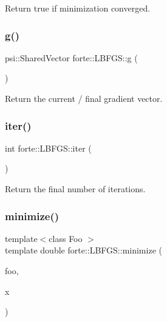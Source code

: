 Return true if minimization converged. 

\mbox{\label{classforte_1_1_l_b_f_g_s_ac92f946ad0a620b0fef33b96619b0b75}} 
\subsubsection{\texorpdfstring{g()}{g()}}
{\footnotesize\ttfamily psi\+::\+Shared\+Vector forte\+::\+L\+B\+F\+G\+S\+::g (\begin{DoxyParamCaption}{ }\end{DoxyParamCaption})\hspace{0.3cm}{\ttfamily [inline]}}



Return the current / final gradient vector. 

\mbox{\label{classforte_1_1_l_b_f_g_s_a90ca8b4968b604d3215c0ea4ce6275d4}} 
\subsubsection{\texorpdfstring{iter()}{iter()}}
{\footnotesize\ttfamily int forte\+::\+L\+B\+F\+G\+S\+::iter (\begin{DoxyParamCaption}{ }\end{DoxyParamCaption})\hspace{0.3cm}{\ttfamily [inline]}}



Return the final number of iterations. 

\mbox{\label{classforte_1_1_l_b_f_g_s_a2e1e9e0d39664cb70a631317d3eeea09}} 
\subsubsection{\texorpdfstring{minimize()}{minimize()}}
{\footnotesize\ttfamily template$<$class Foo $>$ \\
template double forte\+::\+L\+B\+F\+G\+S\+::minimize (\begin{DoxyParamCaption}\item[{Foo \&}]{foo,  }\item[{psi\+::\+Shared\+Vector}]{x }\end{DoxyParamCaption})}



